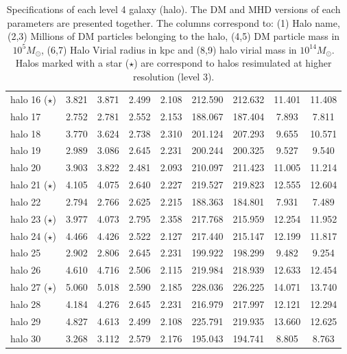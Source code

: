 \documentclass[a4paper,fleqn,usenatbib]{mnras}
\begin{document}
\begin{table}
\begin{tabular}{l|cc|cc|cc|cc}
halo 16 ($\star$)&3.821&3.871&2.499&2.108&212.590&212.632&11.401&11.408\\ 
halo 17&2.752&2.781&2.552&2.153&188.067&187.404&7.893&7.811\\
halo 18&3.770&3.624&2.738&2.310&201.124&207.293&9.655&10.571\\
halo 19&2.989&3.086&2.645&2.231&200.244&200.325&9.527&9.540\\
halo 20&3.903&3.822&2.481&2.093&210.097&211.423&11.005&11.214\\ 
halo 21 ($\star$) &4.105&4.075&2.640&2.227&219.527&219.823&12.555&12.604\\ 
halo 22&2.794&2.766&2.625&2.215&188.363&184.801&7.931&7.489\\ 
halo 23 ($\star$) &3.977&4.073&2.795&2.358&217.768&215.959&12.254&11.952\\
halo 24 ($\star$) &4.466&4.426&2.522&2.127&217.440&215.147&12.199&11.817\\ 
halo 25&2.902&2.806&2.645&2.231&199.922&198.299&9.482&9.254\\
halo 26 &4.610&4.716&2.506&2.115&219.984&218.939&12.633&12.454\\
halo 27 ($\star$) & 5.060&5.018&2.590&2.185&228.036&226.225&14.071&13.740\\ 
halo 28 & 4.184&4.276&2.645&2.231&216.979&217.997&12.121&12.294\\
halo 29 & 4.827&4.613&2.499&2.108&225.791&219.935&13.660&12.625\\
halo 30 & 3.268&3.112&2.579&2.176&195.043&194.741&8.805&8.763\\
\hline
\hline
\end{tabular}
\caption{Specifications of each level 4 galaxy (halo). 
  The DM and MHD versions of each parameters are presented together. 
  The columns correspond to: (1) Halo name, (2,3) Millions of DM
  particles belonging to the halo, (4,5) DM particle mass in
  $10^5M_\odot$, (6,7) Halo Virial radius in kpc and (8,9) halo virial
  mass in $10^{14}M_\odot$. Halos marked with a star ($\star$) are
  correspond to halos resimulated at higher resolution (level 3).}  
\label{tab:level4}
\end{table} 
\end{document}
